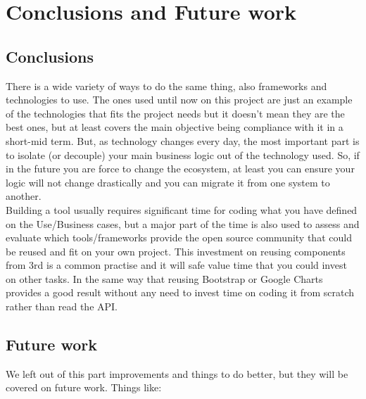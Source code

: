 \part{Conclusions and Future work}



\chapter{Conclusions}
There is a wide variety of ways to do the same thing, also frameworks and
technologies to use. The ones used until now on this project are just an example
of the technologies that fits the project needs but it doesn't mean they are the best
ones, but at least covers the main objective being compliance with it in a
short-mid term. But, as technology changes every day, the most important part is
to isolate (or decouple) your main business logic out of the technology used.
So, if in the future you are force to change the ecosystem, at least you can ensure your
logic will not change drastically and you can migrate it from one system to
another.\\

Building a tool usually requires significant time for coding what you have
defined on the Use/Business cases, but a major part of the time is also used to
assess and evaluate which tools/frameworks provide the open source community
that could be reused and fit on your own project. This investment on reusing
components from 3rd is a common practise and it will safe value time that you
could invest on other tasks. 
In the same way that reusing Bootstrap or Google
Charts provides a good result without any need to invest time on coding it from
scratch rather than read the API.\\

\chapter{Future work}
We left out of this part improvements and things to do better, but they will be
covered on future work. Things like:


